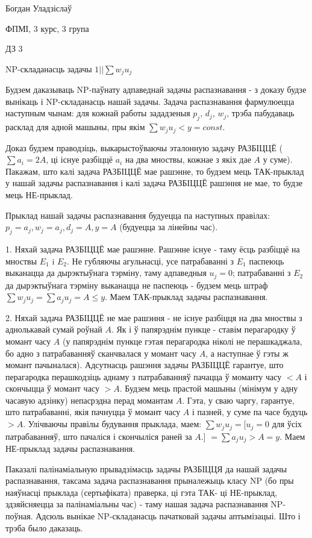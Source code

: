 \documentclass{article}
\begin{document}
{\large

Богдан Уладзіслаў

ФПМІ, 3 курс, 3 група

\vspace{5mm}

ДЗ 3

NP-складанасць задачы $1||\sum w_j u_j$

}

\vspace{15mm}

Будзем даказываць NP-паўнату адпаведнай задачы распазнавання - з доказу будзе вынікаць і NP-складанасць нашай задачы.
Задача распазнавання фармулюецца наступным чынам: для кожнай работы зададзеныя $p_j$, $d_j$, $w_j$, трэба пабудаваць
расклад для адной машыны, пры якім $\sum w_j u_j < y = const$.

Доказ будзем праводзіць, выкарыстоўваючы эталонную задачу РАЗБІЦЦЁ ($\sum a_i = 2A$, ці існуе разбіццё $a_i$ на два мноствы,
кожнае з якіх дае $A$ у суме). Пакажам, што калі задача РАЗБІЦЦЁ мае рашэнне, то
будзем мець ТАК-прыклад у нашай задачы распазнавання і калі задача РАЗБІЦЦЁ рашэння не мае, то будзе мець НЕ-прыклад.

Прыклад нашай задачы распазнавання будуецца па наступных правілах: $p_j = a_j, w_j = a_j, d_j = A, y = A$ (будуецца за лінейны час).

1. Няхай задача РАЗБІЦЦЁ мае рашэнне. Рашэнне існуе - таму ёсць разбіццё на мноствы $E_1$ i $E_2$. Не губляючы агульнасці,
усе патрабаванні з $E_1$ паспеюць выканацца
да дырэктыўнага тэрміну, таму адпаведныя $u_j = 0$; патрабаванні з $E_2$ да дырэктыўнага тэрміну выканацца не паспеюць - будзем мець
штраф $\sum w_j u_j = \sum a_j u_j = A \le y$. Маем ТАК-прыклад задачы распазнавання.

2. Няхай задача РАЗБІЦЦЁ не мае рашэння - не існуе разбіцця на два мноствы з аднолькавай сумай роўнай $A$. Як і ў папярэднім пункце -
ставім перагародку ў момант часу $A$ (у папярэднім пункце гэтая перагародка ніколі не перашкаджала, бо адно з патрабаванняў сканчвалася
у момант часу $A$, а наступнае ў гэты ж момант пачыналася). Адсутнасць рашэння задачы РАЗБІЦЦЁ гарантуе, што перагародка перашкодзіць
аднаму з патрабаванняў пачацца ў моманту часу $<A$ і скончыцца ў момант часу $>A$. Будзем мець прастой машыны (мінімум у адну часавую адзінку)
непасрэдна перад момантам $A$. Гэта, у сваю чаргу, гарантуе, што патрабаванні, якія пачнуцца ў момант часу $A$ і пазней, у суме
па часе будуць $>A$. Улічваючы правілы будування прыклада, маем: $\sum w_j u_j = $[$u_j = 0$ для ўсіх патрабаванняў, што пачаліся і скончыліся
раней за $A$.] $=\sum a_j u_j > A = y$. Маем НЕ-прыклад задачы распазнавання.

Паказалі палінаміальную прывадзімасць задачы РАЗБІЦЦЯ да нашай задачы распазнавання, таксама задача распазнавання прыналежыць класу NP
(бо пры наяўнасці прыклада (сертыфіката) праверка, ці гэта ТАК- ці НЕ-прыклад, здзяйсняецца за палінаміальны час) -
таму нашая задача распазнавання NP-поўная.
Адсюль вынікае NP-складанасць пачатковай задачы аптымізацыі. Што і трэба было даказаць.
\end{document}
